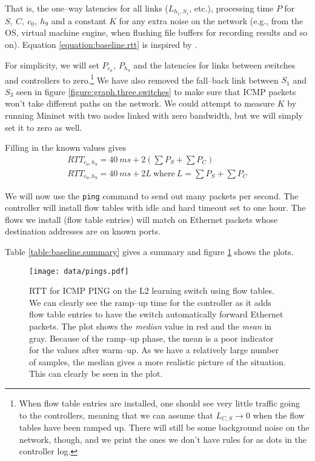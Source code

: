 That is, the one--way latencies for all links ($L_{h_1,S_1}$, etc.), processing time $P$ for
$S,~C,~c_0,~h_9$ and a constant $K$ for any extra noise on the network
(e.g., from the OS, virtual machine engine, when flushing file buffers for
 recording results and so on).
Equation \ref{equation:baseline.rtt} is inspired by \cite{DBLP:conf/cnsm/PhemiusB13}.

For simplicity, we will set $P_{c_0},~P_{h_9}$ and the
latencies for links between switches and controllers to zero.\footnote{When
flow table entries are installed, one should see very little traffic going
to the controllers, meaning that we can
assume that $L_{C,S} \to 0$ when the flow tables have been ramped up.
There will still be some background noise on the network, though, and we
print the ones we don't have rules for as dots in the controller log.}
We have also removed the fall--back link
between $S_1$ and $S_3$ seen in figure \ref{figure:graph.three.switches}
to make sure that ICMP packets won't take different paths on the network.
We could attempt to measure $K$ by running Mininet with two nodes linked
with zero bandwidth, but we will simply set it to zero as well.

Filling in the known values gives
\begin{gather}
  RTT_{c_0,h_9} = 40~ms + 2\left( \sum P_S + \sum P_C \right)
  \\
  RTT_{c_0,h_9} = 40~ms + 2L~\text{where}~L = \sum P_S + \sum P_C
  \label{equation:expected.baseline.rtt}
\end{gather}

We will now use the \texttt{ping} command to send out many packets per
second.  The controller will install flow tables with idle and hard timeout
set to one hour. The flows we install (flow table entries) will match on
Ethernet packets whose destination addresses are on known ports.

Table \ref{table:baseline.summary} gives a summary and figure
\ref{benchmark:l2.learning.switch.ping} shows the plots.



\begin{figure}
  \centering
  \texttt{[image: data/pings.pdf]}
  \caption{\acs{RTT} for ICMP PING on the L2 learning switch using flow tables.
           We can clearly see the ramp--up time for the controller as it
           adds flow table entries to have the switch automatically forward
           Ethernet packets. The plot shows the \textit{median} value in red
  and the \textit{mean} in gray.  Because of the ramp--up phase, the mean is a poor
  indicator for the values after warm--up.  As we have a relatively large
  number of samples, the median gives a more realistic picture of the
  situation.  This can clearly be seen in the plot.}
  \label{benchmark:l2.learning.switch.ping}
\end{figure}

